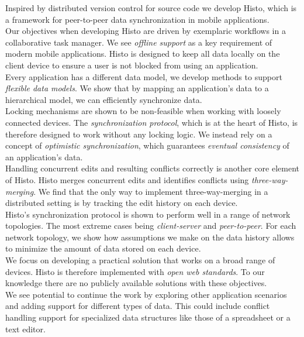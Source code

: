 

Inspired by distributed version control for source code we develop Histo, which is a framework for peer-to-peer data synchronization in mobile applications.\\
Our objectives when developing Histo are driven by exemplaric workflows in a collaborative task manager.
We see \emph{offline support} as a key requirement of modern mobile applications.
Histo is designed to keep all data locally on the client device to ensure a user is not blocked from using an application.\\
Every application has a different data model, we develop methods to support \emph{flexible data models}.
We show that by mapping an application's data to a hierarchical model, we can efficiently synchronize data.\\
Locking mechanisms are shown to be non-feasible when working with loosely connected devices.
The \emph{synchronization protocol}, which is at the heart of Histo, is therefore designed to work without any locking logic.
We instead rely on a concept of \emph{optimistic synchronization}, which guarantees \emph{eventual consistency} of an application's data.\\
Handling concurrent edits and resulting conflicts correctly is another core element of Histo.
Histo merges concurrent edits and identifies conflicts using \emph{three-way-merging}.
We find that the only way to implement three-way-merging in a distributed setting is by tracking the edit history on each device.\\
Histo's synchronization protocol is shown to perform well in a range of network topologies.
The most extreme cases being \emph{client-server} and \emph{peer-to-peer}.
For each network topology, we show how assumptions we make on the data history allows to minimize the amount of data stored on each device.\\
We focus on developing a practical solution that works on a broad range of devices.
Histo is therefore implemented with \emph{open web standards}.
To our knowledge there are no publicly available solutions with these objectives.\\
We see potential to continue the work by exploring other application scenarios and adding support for different types of data.
This could include conflict handling support for specialized data structures like those of a spreadsheet or a text editor.